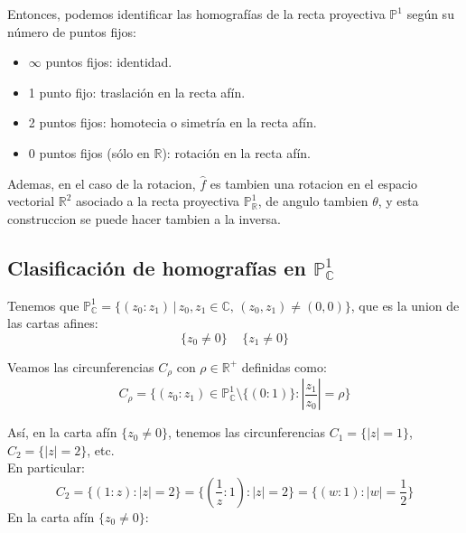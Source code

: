 Entonces, podemos identificar las homografías de la recta proyectiva $\mathbb{P}^1$ según su número de puntos fijos:
\begin{itemize}
    \item $\infty$ puntos fijos: identidad.
    \item 1 punto fijo: traslación en la recta afín.
    \item 2 puntos fijos: homotecia o simetría en la recta afín.
    \item 0 puntos fijos (sólo en $\mathbb{R}$): rotación en la recta afín.
\end{itemize}

Ademas, en el caso de la rotacion, $\hat{f}$ es tambien una rotacion en el espacio vectorial $\mathbb{R}^2$ asociado a la recta proyectiva $\mathbb{P}^1_{\mathbb{R}}$, de angulo tambien $\theta$, y esta construccion se puede hacer tambien a la inversa.

\subsection{Clasificación de homografías en $\mathbb{P}^1_{\mathbb{C}}$}

Tenemos que $\mathbb{P}^1_{\mathbb{C}} = \{ (z_0 : z_1) \, | \, z_0, z_1 \in \mathbb{C}, \, (z_0, z_1) \neq (0,0) \}$, que es la union de las cartas afines:
\[
\{ z_0 \neq 0 \}
\, \quad
\{ z_1 \neq 0 \}
\]

Veamos las circunferencias $C_\rho$ con $\rho \in \mathbb{R}^+$ definidas como:
\[
C_\rho = \{ (z_0 : z_1) \in \mathbb{P}^1_{\mathbb{C}} \setminus \{(0:1)\} :
\left| \frac{z_1}{z_0} \right| = \rho \}
\]

Así, en la carta afín $\{ z_0 \neq 0 \}$, tenemos las circunferencias $C_1 = \{ |z| = 1 \}$, $C_2 = \{ |z| = 2 \}$, etc.\\
En particular:
\[
C_2 =
\{ (1:z) : |z| = 2 \} =
\{ (\frac{1}{z} : 1) : |z| = 2 \} =
\{ (w : 1) : |w| = \frac{1}{2} \}
\]
En la carta afín $\{ z_0 \neq 0 \}$:
\begin{center}
\end{center}

